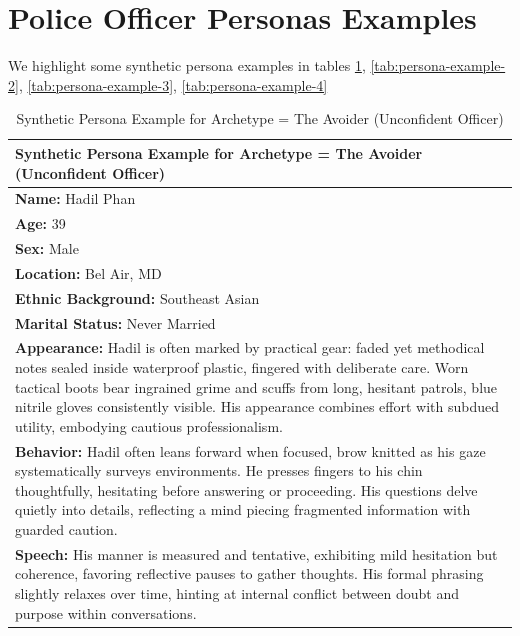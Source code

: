 \documentclass[11pt]{article}
\begin{document}
\section{Police Officer Personas Examples}\label{app:officer_examples}

We highlight some synthetic persona examples in tables \ref{tab:persona-example-1}, \ref{tab:persona-example-2}, \ref{tab:persona-example-3}, \ref{tab:persona-example-4}

\begin{table}[ht]
\centering
\caption{Synthetic Persona Example for Archetype = The Avoider (Unconfident Officer)}
\label{tab:persona-example-1}
\scriptsize %
\begin{tabularx}{\textwidth}{X}
\toprule
\textbf{Synthetic Persona Example for Archetype = The Avoider (Unconfident Officer)} \\
\midrule
\textbf{Name:} Hadil Phan \\
\textbf{Age:} 39 \\
\textbf{Sex:} Male \\
\textbf{Location:} Bel Air, MD \\
\textbf{Ethnic Background:} Southeast Asian \\
\textbf{Marital Status:} Never Married \\[4pt]

\textbf{Appearance:} Hadil is often marked by practical gear: faded yet methodical notes sealed inside waterproof plastic, fingered with deliberate care. Worn tactical boots bear ingrained grime and scuffs from long, hesitant patrols, blue nitrile gloves consistently visible. His appearance combines effort with subdued utility, embodying cautious professionalism. \\[4pt]

\textbf{Behavior:} Hadil often leans forward when focused, brow knitted as his gaze systematically surveys environments. He presses fingers to his chin thoughtfully, hesitating before answering or proceeding. His questions delve quietly into details, reflecting a mind piecing fragmented information with guarded caution. \\[4pt]

\textbf{Speech:} His manner is measured and tentative, exhibiting mild hesitation but coherence, favoring reflective pauses to gather thoughts. His formal phrasing slightly relaxes over time, hinting at internal conflict between doubt and purpose within conversations. \\[4pt]


\end{tabularx}
\end{table}
\end{document}
